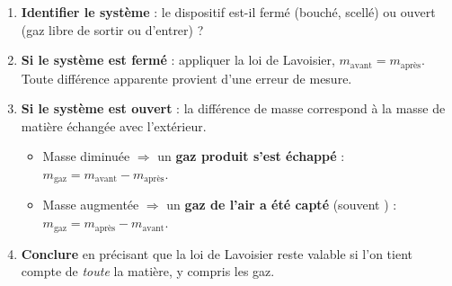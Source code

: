 \documentclass[11pt]{article}
\newcommand{\cle}[1]{{\popxbold\color{popdark}#1}}
\begin{document}
\begin{methode}
\begin{enumerate}
\item \textbf{Identifier le système} : le dispositif est-il \cle{fermé} (bouché, scellé) ou \cle{ouvert} (gaz libre de sortir ou d'entrer) ?
\item \textbf{Si le système est fermé} : appliquer la loi de Lavoisier, $m_{\text{avant}} = m_{\text{après}}$. Toute différence apparente provient d'une erreur de mesure.
\item \textbf{Si le système est ouvert} : la différence de masse correspond à la masse de matière échangée avec l'extérieur.
   \begin{itemize}
   \item Masse diminuée $\Rightarrow$ un \textbf{gaz produit s'est échappé} : $m_{\text{gaz}} = m_{\text{avant}} - m_{\text{après}}$.
   \item Masse augmentée $\Rightarrow$ un \textbf{gaz de l'air a été capté} (souvent ) : $m_{\text{gaz}} = m_{\text{après}} - m_{\text{avant}}$.
   \end{itemize}
\item \textbf{Conclure} en précisant que la loi de Lavoisier reste valable si l'on tient compte de \emph{toute} la matière, y compris les gaz.
\end{enumerate}
\end{methode}
\end{document}
